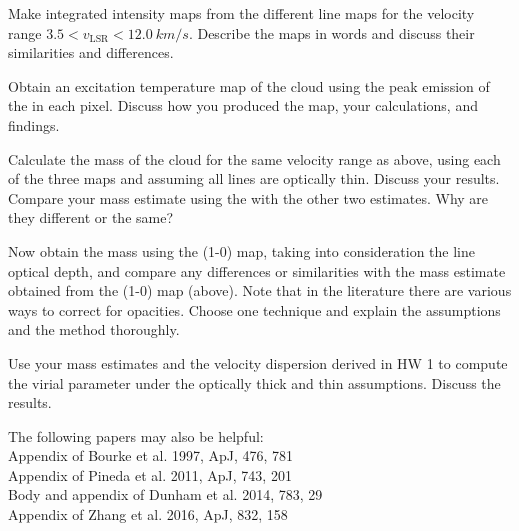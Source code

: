 \documentclass[11pt]{article}
\newenvironment{tight_enumerate}{
\begin{enumerate}[label=(\alph*)]
\setlength{\itemsep}{3pt}
\setlength{\parskip}{0pt}
}{\end{enumerate}}
\begin{document}
\begin{tight_enumerate}
\item Make integrated intensity maps from the different line maps for the velocity range $3.5 < v_{\text{LSR}} < 12.0\ \si{km/s}$. Describe the maps in words and discuss their similarities and differences.
\item Obtain an excitation temperature map of the cloud using the peak emission of the  in each pixel. Discuss how you produced the map, your calculations, and findings.
\item Calculate the mass of the cloud for the same velocity range as above, using each of the three maps and assuming all lines are optically thin. Discuss your results. Compare your mass estimate using the  with the other two estimates. Why are they different or the same?
\item Now obtain the mass using the  (1-0) map, taking into consideration the line optical depth, and compare any differences or similarities with the mass estimate obtained from the  (1-0) map (above). Note that in the literature there are various ways to correct for opacities. Choose one technique and explain the assumptions and the method thoroughly.
\item Use your mass estimates and the velocity dispersion derived in HW 1 to compute the virial parameter under the optically thick and thin assumptions. Discuss the results.
\end{tight_enumerate}
The following papers may also be helpful:\\
Appendix of Bourke et al. 1997, ApJ, 476, 781\\
Appendix of Pineda et al. 2011, ApJ, 743, 201\\
Body and appendix of Dunham et al. 2014, 783, 29\\
Appendix of Zhang et al. 2016, ApJ, 832, 158

\newpage
\end{document}
